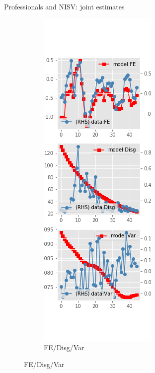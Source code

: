 \documentclass{beamer}
\begin{document}
\begin{frame}{Professionals and NISV: joint estimates}
\begin{figure}[ht]
\begin{subfigure}[b]{0.2\textwidth}
		\end{subfigure}
		\hfill
		\begin{subfigure}[b]{0.2\textwidth}
			\caption{FE/Disg/Var}
			\includegraphics[width=\textwidth, height = 0.8\textheight]{figuresDraft/spf_ni_est_sv_joint_diag3.png}
		\end{subfigure}
	\end{figure}
\end{frame}
\end{document}
